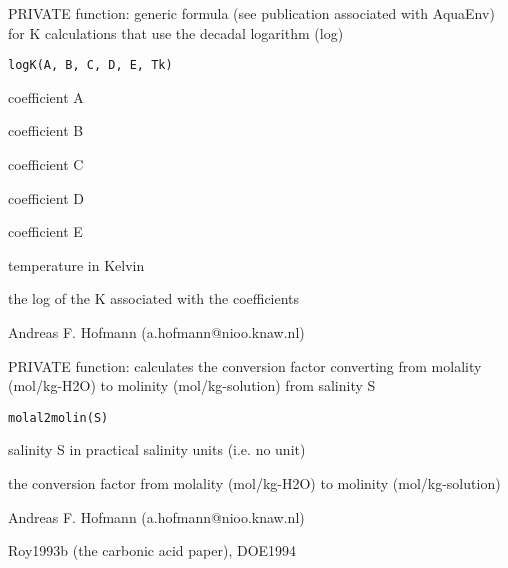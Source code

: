 \documentclass{article}
\begin{document}
\begin{Description}\relax
PRIVATE function: generic formula (see publication associated with AquaEnv) for K calculations that use the decadal logarithm (log)
\end{Description}
\begin{Usage}
\begin{verbatim}logK(A, B, C, D, E, Tk)\end{verbatim}
\end{Usage}
\begin{Arguments}
\begin{ldescription}
\item[\code{A }] coefficient A
\item[\code{B }] coefficient B
\item[\code{C }] coefficient C
\item[\code{D }] coefficient D
\item[\code{E }] coefficient E
\item[\code{Tk }] temperature in Kelvin
\end{ldescription}
\end{Arguments}
\begin{Value}
the log of the K associated with the coefficients
\end{Value}
\begin{Author}\relax
Andreas F. Hofmann (a.hofmann@nioo.knaw.nl)
\end{Author}


\begin{Description}\relax
PRIVATE function: calculates the conversion factor converting from molality (mol/kg-H2O) to molinity (mol/kg-solution) from salinity S
\end{Description}
\begin{Usage}
\begin{verbatim}molal2molin(S)\end{verbatim}
\end{Usage}
\begin{Arguments}
\begin{ldescription}
\item[\code{S }] salinity S in practical salinity units (i.e. no unit)
\end{ldescription}
\end{Arguments}
\begin{Value}
the conversion factor from molality (mol/kg-H2O) to molinity (mol/kg-solution)
\end{Value}
\begin{Author}\relax
Andreas F. Hofmann (a.hofmann@nioo.knaw.nl)
\end{Author}
\begin{References}\relax
Roy1993b (the carbonic acid paper), DOE1994
\end{References}
\end{document}
